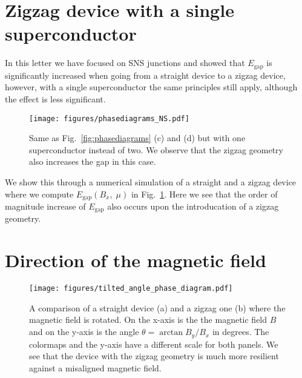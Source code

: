 \documentclass[english, twocolumn, 10pt, aps, superscriptaddress, floatfix, prb, citeautoscript]{revtex4-1}
\renewcommand{\comment}[2]{#2}
\begin{document}
\appendix

\section{Zigzag device with a single superconductor}

\comment{The same principle applies to devices with only one superconductor.}
In this letter we have focused on SNS junctions and showed that $E_\textrm{gap}$ is significantly increased when going from a straight device to a zigzag device, however, with a single superconductor the same principles still apply, although the effect is less significant.

\begin{figure}[!htb]
\centering
\texttt{[image: figures/phasediagrams\_NS.pdf]}
\caption{Same as Fig.~\ref{fig:phasediagrams} (c) and (d) but with one superconductor instead of two.
We observe that the zigzag geometry also increases the gap in this case.
\label{fig:ns_junction}}
\end{figure}

\comment{We run the simulation and observe that the phase diagrams are the same but the zigzag device is still better.}
We show this through a numerical simulation of a straight and a zigzag device where we compute $E_\textrm{gap}(B_x, \; \mu)$ in Fig.~\ref{fig:ns_junction}.
Here we see that the order of magnitude increase of $E_\textrm{gap}$ also occurs upon the introducation of a zigzag geometry.


\section{Direction of the magnetic field}

\comment{Short trajectories are less sensitive to the alignment of magnetic field.}

\comment{Zigzag geometry removes the need for precise field alignment.}

\begin{figure}[!htb]
\centering
\texttt{[image: figures/tilted\_angle\_phase\_diagram.pdf]}
\caption{A comparison of a straight device (a) and a zigzag one (b) where the magnetic field is rotated.
On the x-axis is the the magnetic field $B$ and on the y-axis is the angle $\theta=\arctan{B_y/B_x}$ in degrees.
The colormaps and the y-axis have a different scale for both panels.
We see that the device with the zigzag geometry is much more resilient against a misaligned magnetic field.
\label{fig:tilted_angle_phase_diagram}}
\end{figure}
\end{document}
